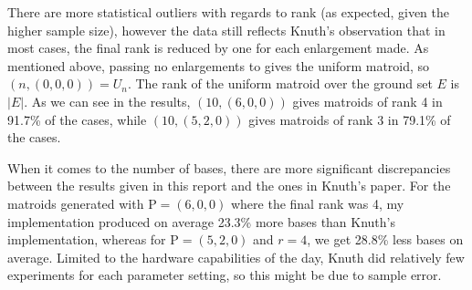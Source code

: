 There are more statistical outliers with regards to rank (as expected, given the higher sample size), however the data still reflects Knuth's observation that in most cases, the final rank is reduced by one for each enlargement made. As mentioned above, passing no enlargements to  gives the uniform matroid, so $(n, (0,0,0)) = U_n$. The rank of the uniform matroid over the ground set $E$ is $|E|$. As we can see in the results, $(10, (6,0,0))$ gives matroids of rank 4 in 91.7\% of the cases, while $(10, (5,2,0))$ gives matroids of rank 3 in 79.1\% of the cases.

When it comes to the number of bases, there are more significant discrepancies between the results given in this report and the ones in Knuth's paper. For the matroids generated with $\mathrm{P} = (6,0,0)$ where the final rank was 4, my implementation produced on average 23.3\% more bases than Knuth's implementation, whereas for $\mathrm{P} = (5,2,0)$ and $r=4$, we get 28.8\% less bases on average. Limited to the hardware capabilities of the day, Knuth did relatively few experiments for each parameter setting, so this might be due to sample error.



